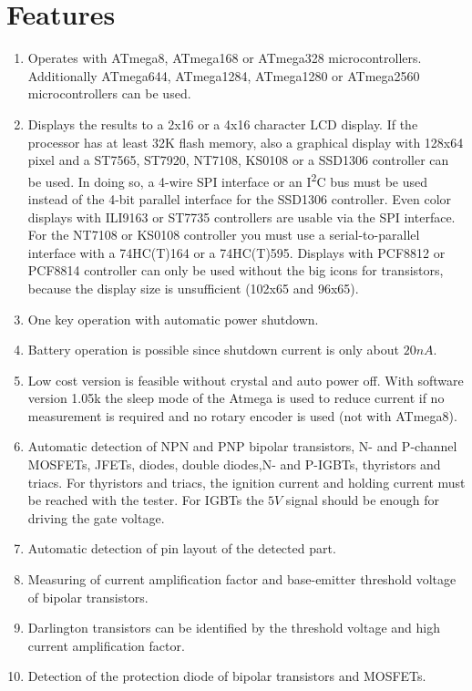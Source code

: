 \chapter{Features}
\label{sec:features}
\begin{enumerate} \setlength{\itemsep}{0pt}
\item Operates with ATmega8, ATmega168 or ATmega328 microcontrollers. Additionally ATmega644, ATmega1284,
ATmega1280 or ATmega2560 microcontrollers can be used.
\item Displays the results to a 2x16 or a 4x16 character LCD display.
 If the processor has at least 32K flash memory, also a graphical display with 128x64 pixel and
a ST7565, ST7920, NT7108, KS0108 or a SSD1306 controller can be used.
In doing so, a 4-wire SPI interface or an I\textsuperscript{2}C bus must be used instead of the 4-bit parallel interface for
the SSD1306 controller.
Even color displays with ILI9163 or ST7735 controllers are usable via the SPI interface.
For the NT7108 or KS0108 controller you must use a serial-to-parallel interface with a 74HC(T)164 or a 74HC(T)595.
Displays with PCF8812 or PCF8814 controller can only be used without the big icons for transistors, because the display size is
unsufficient (102x65 and 96x65).
\item One key operation with automatic power shutdown.
\item Battery operation is possible since shutdown current is only about \(20nA\).
\item Low cost version is feasible without crystal and auto power off.
With software version 1.05k the sleep mode of the Atmega is used to reduce current if
no measurement is required and no rotary encoder is used (not with ATmega8).
\item Automatic detection of NPN and PNP bipolar transistors, N- and P-channel MOSFETs, JFETs,
diodes, double diodes,N- and P-IGBTs, thyristors and triacs.
For thyristors and triacs, the ignition current and holding current must be reached with the tester.
For IGBTs the \(5V\) signal should be enough for driving the gate voltage.
\item Automatic detection of pin layout of the detected part.
\item Measuring of current amplification factor and base-emitter threshold voltage of bipolar transistors.
\item Darlington transistors can be identified by the threshold voltage and high current amplification factor.
\item Detection of the protection diode of bipolar transistors and MOSFETs.

\end{enumerate}
